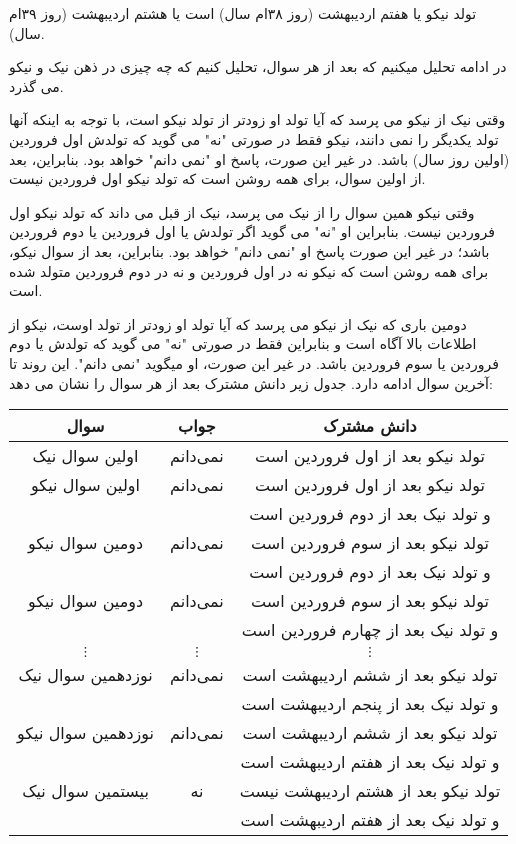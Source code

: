 \begin{solution}
تولد نیکو  یا هفتم اردیبهشت (روز ۳۸ام سال) است یا هشتم اردیبهشت (روز ۳۹ام سال).

در ادامه تحلیل میکنیم که بعد از هر سوال، تحلیل کنیم که چه چیزی در ذهن نیک و نیکو می گذرد.

وقتی نیک از نیکو می پرسد که آیا تولد او زودتر از تولد نیکو است، با توجه به اینکه آنها تولد یکدیگر را نمی دانند، نیکو فقط در صورتی "نه" می گوید که تولدش اول فروردین (اولین روز سال) باشد. در غیر این صورت، پاسخ او "نمی دانم" خواهد بود. بنابراین، بعد از اولین سوال، برای همه روشن است که تولد نیکو اول فروردین نیست.

وقتی نیکو همین سوال را از نیک می پرسد، نیک از قبل می داند که تولد نیکو اول فروردین نیست. بنابراین او "نه" می گوید اگر تولدش یا اول فروردین یا دوم فروردین باشد؛ در غیر این صورت پاسخ او "نمی دانم" خواهد بود. بنابراین، بعد از سوال نیکو، برای همه روشن است که نیکو نه در اول فروردین و نه در دوم فروردین متولد شده است.

دومین باری که نیک از نیکو می پرسد که آیا تولد او زودتر از تولد اوست، نیکو از اطلاعات بالا آگاه است و بنابراین فقط در صورتی "نه" می گوید  که تولدش یا دوم فروردین یا سوم فروردین باشد. در غیر این صورت، او میگوید "نمی دانم". این روند تا آخرین سوال ادامه دارد. جدول زیر دانش مشترک بعد از هر سوال را نشان می دهد:

\begin{center}
	\begin{tabular}{|c|c|c|}
		\hline
		سوال & جواب & دانش مشترک \\
		\hline
		اولین سوال نیک & نمی‌دانم & تولد نیکو بعد از اول فروردین است \\
		\hline 
		اولین سوال نیکو & نمی‌دانم & تولد نیکو بعد از اول فروردین است \\
		& & و تولد نیک بعد از دوم فروردین است \\
		\hline
		دومین سوال نیکو & نمی‌دانم & تولد نیکو بعد از سوم فروردین است \\
		& & و تولد نیک بعد از دوم فروردین است \\
		\hline
		دومین سوال نیکو & نمی‌دانم & تولد نیکو بعد از سوم فروردین است \\
		& & و تولد نیک بعد از چهارم فروردین است \\
		\hline
		$\vdots$ & $\vdots$ & $\vdots$ \\
		\hline
		نوزدهمین سوال نیک & نمی‌دانم & تولد نیکو بعد از ششم اردیبهشت است \\
		& & و تولد نیک بعد از پنجم اردیبهشت است \\
		\hline
		نوزدهمین سوال نیکو & نمی‌دانم & تولد نیکو بعد از ششم اردیبهشت است \\
		& & و تولد نیک بعد از هفتم اردیبهشت است \\
		\hline
		بیستمین سوال نیک & نه & تولد نیکو بعد از هشتم اردیبهشت نیست \\
		& & و تولد نیک بعد از هفتم اردیبهشت است \\
		\hline
	\end{tabular}
\end{center}

\end{solution}


